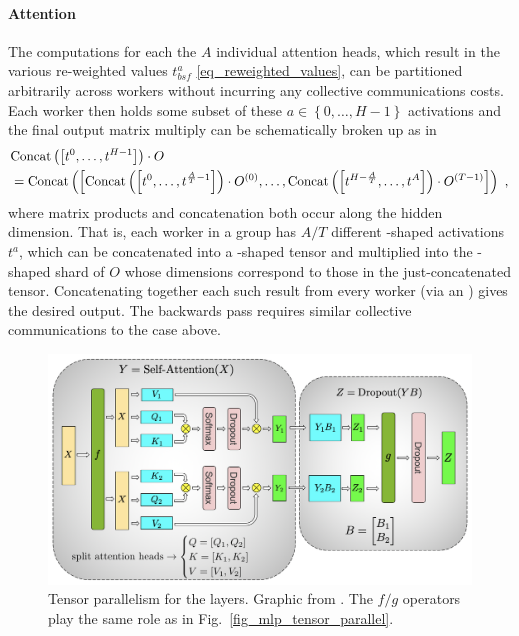 \documentclass[11pt]{article}
\begin{document}
 \paragraph{Attention} The computations for each the $ A $ individual attention heads, which result
 in the various re-weighted values $ t ^{ a }_{ bsf } $ \eqref{eq_reweighted_values}, can be
 partitioned arbitrarily across workers without incurring any collective communications costs.  Each
 worker then holds some subset of these $ a \in \left \{ 0, \ldots , H-1 \right \} $ activations and
 the final output matrix multiply can be schematically broken up as in \begin{align} &{\rm Concat}
     \left ( \left [ t ^{ 0 }, \ldots , t ^{ H-1 } \right ] \right ) \cdot O \nonumber\\ &= {\rm Concat}
     \left ( \left [ {\rm Concat}\left ( \left [ t ^{ 0 }, \ldots , t ^{ \frac{ A }{ T }-1 } \right
     ] \right ) \cdot O ^{ (0) }, \ldots ,{\rm Concat}\left ( \left [ t ^{ H-\frac{ A }{ T } },
\ldots , t ^{ A} \right ] \right ) \cdot O ^{ (T-1) } \right ] \right ) \ , \end{align} where matrix
products and concatenation both occur along the hidden dimension. That is, each worker in a group
has $ A/T $ different -shaped activations $ t ^{ a } $, which can be
concatenated into a -shaped tensor and multiplied into the
-shaped shard of $ O $ whose dimensions correspond to those in the just-concatenated tensor.
Concatenating together each such result from every worker (via an ) gives the
desired output. The backwards pass requires similar collective communications to the 
case above.


 \begin{figure}[ht]
     \centering
     \includegraphics[scale=.3]{figures/attention_mp_2.png}
     \caption{Tensor parallelism for the  layers. Graphic from
     \cite{shoeybi2020megatronlm}. The $ f/g $ operators play the same role as in
 Fig.~\ref{fig_mlp_tensor_parallel}.}
     \label{fig_attn_tensor_parallel}
 \end{figure}
\end{document}

